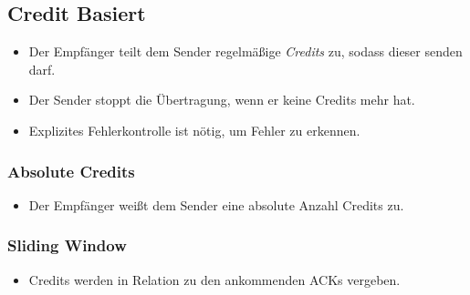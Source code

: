 \documentclass[a4paper, 11pt, accentcolor = tud3b]{tudreport}
\begin{document}
            \subsection{Credit Basiert}
                \begin{itemize}
                	\item Der Empfänger teilt dem Sender regelmäßige \textit{Credits} zu, sodass dieser senden darf.
                	\item Der Sender stoppt die Übertragung, wenn er keine Credits mehr hat.
                	\item Explizites Fehlerkontrolle ist nötig, um Fehler zu erkennen.
                \end{itemize}
                
                \subsubsection{Absolute Credits}
	                \begin{itemize}
	                	\item Der Empfänger weißt dem Sender eine absolute Anzahl Credits zu.
	                \end{itemize}

                \subsubsection{Sliding Window}
                    \begin{itemize}
                    	\item Credits werden in Relation zu den ankommenden ACKs vergeben.
                    \end{itemize}
\end{document}
